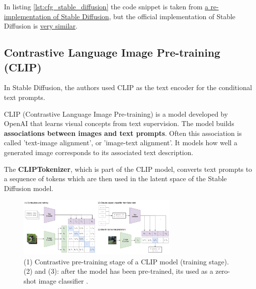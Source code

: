 In listing \ref{lst:cfg_stable_diffusion} the code snippet is taken from \href{https://github.com/hkproj/pytorch-stable-diffusion/blob/e0cb06de011787cdf13eed7b4287ad8410491149/sd/pipeline.py#L135C1-L136C1}{a re-implementation of Stable Diffusion}, but the official implementation of Stable Diffusion is \href{https://github.com/CompVis/stable-diffusion/blob/21f890f9da3cfbeaba8e2ac3c425ee9e998d5229/ldm/models/diffusion/ddim.py#L178C1-L179C1}{very similar}.

















\subsection{Contrastive Language Image Pre-training (CLIP)}
\label{subsec:clip}

In Stable Diffusion, the authors used CLIP as the text encoder for the conditional text prompts.

CLIP (Contrastive Language Image Pre-training) \cite{openai_clip} is a model developed by OpenAI that learns visual concepts from text supervision. The model builds \textbf{associations between images and text prompts}. Often this association is called 'text-image alignment', or 'image-text alignment'. It models how well a generated image corresponds to its associated text description.

The \textbf{CLIPTokenizer}, which is part of the CLIP model, converts text prompts to a sequence of tokens which are then used in the latent space of the Stable Diffusion model.

\begin{figure}
    \centering
    \includegraphics[width=0.7\textwidth]{images/diffusion_models/stable_diffusion/clip.png}
    \caption{(1) Contrastive pre-training stage of a CLIP model (training stage). (2) and (3): after the model has been pre-trained, its used as a zero-shot image classifier \cite{openai_clip}.}
    \label{fig:openai_clip}
\end{figure}

